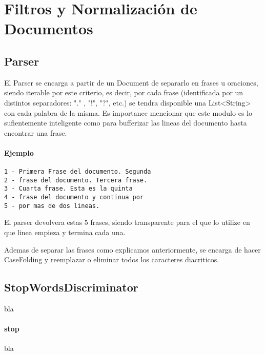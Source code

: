 \section{Filtros y Normalización de Documentos}

\subsection{Parser}
El Parser se encarga a partir de un Document de separarlo en frases u oraciones, siendo iterable por este criterio, es decir, por cada frase (identificada por un distintos separadores: "." , "!", "?", etc.) se tendra disponible una List<String> con cada palabra de la misma. Es importance mencionar que este modulo es lo sufientemente inteligente como para bufferizar las lineas del documento hasta encontrar una frase. 

\paragraph{Ejemplo}

\begin{verbatim}
1 - Primera Frase del documento. Segunda
2 - frase del documento. Tercera frase.
3 - Cuarta frase. Esta es la quinta
4 - frase del documento y continua por
5 - por mas de dos lineas.
\end{verbatim}

El parser devolvera estas 5 frases, siendo transparente para el que lo utilize en que linea empieza y termina cada una.

Ademas de separar las frases como explicamos anteriormente, se encarga de hacer CaseFolding y reemplazar o eliminar todos los caracteres diacriticos.


\subsection{StopWordsDiscriminator}

bla
\paragraph{stop}

bla
